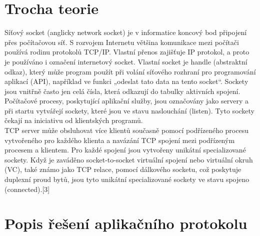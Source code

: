 \documentclass[11pt]{article}
\begin{document}
	\section{Trocha teorie}
	\begin{flushleft}
		Síťový socket (anglicky network socket) je v informatice koncový bod připojení přes počítačovou síť. S rozvojem Internetu většina komunikace mezi počítači používá rodinu protokolů TCP/IP. Vlastní přenos zajišťuje IP protokol, a proto je používáno i označení internetový socket. Vlastní socket je handle (abstraktní odkaz), který může program použít při volání síťového rozhraní pro programování aplikací (API), například ve funkci „odeslat tato data na tento socket“. Sockety jsou vnitřně často jen celá čísla, která odkazují do tabulky aktivních spojení.\\[0.5 cm]
		
		Počítačové procesy, poskytující aplikační služby, jsou označovány jako servery a při startu vytvářejí sockety, které jsou ve stavu naslouchání (listen). Tyto sockety čekají na iniciativu od klientských programů.\\[0.5 cm]
		
		TCP server může obsluhovat více klientů současně pomocí podřízeného procesu vytvořeného pro každého klienta a navázání TCP spojení mezi podřízeným procesem a klientem. Pro každé spojení jsou vytvořeny unikátní specializované sockety. Když je zaváděno socket-to-socket virtuální spojení nebo virtuální okruh (VC), také známo jako TCP relace, pomocí dálkového socketu, což poskytuje duplexní proud bytů, jsou tyto unikátní specializované sockety ve stavu spojeno (connected).[3]\\[0.5 cm] 			
	\end{flushleft}
	
	\newpage
	\section{Popis řešení aplikačního protokolu}
\end{document}
